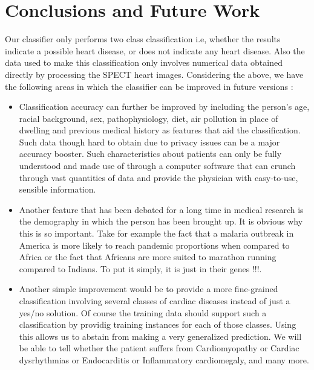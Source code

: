 \documentclass[11pt,a4paper]{report}
\begin{document}
{%



\chapter{Conclusions and Future Work}

Our classifier only performs two class classification i.e, whether the results indicate a possible heart disease, or does not indicate any heart disease. Also the data used to make this classification only involves numerical data obtained directly by processing the SPECT heart images. Considering the above, we have the following areas in which the classifier can be improved in future versions :\\

\begin{itemize}    
\item Classification accuracy can further be improved by including the person’s age, racial background, sex, pathophysiology, diet, air pollution in place of dwelling and previous medical history as features that aid the classification. Such data though hard to obtain due to privacy issues can be a major accuracy booster. Such characteristics about patients can only be fully understood and made use of through a computer software that can crunch through vast quantities of data and provide the physician with easy-to-use, sensible information. \\
\item Another feature that has been debated for a long time in medical research is the demography in which the person has been brought up. It is obvious why this is so important. Take for example the fact that a malaria outbreak in America is more likely to reach pandemic proportions when compared to Africa or the fact that Africans are more suited to marathon running compared to Indians. To put it simply, it is just in their genes !!!. \\
\item Another simple improvement would be to provide a more fine-grained classification involving several classes of cardiac diseases instead of just a yes/no solution. Of course the training data should support such a classification by providig training instances for each of those classes. Using this allows us to abstain from making a very generalized prediction. We will be able to tell whether the patient suffers from Cardiomyopathy or Cardiac dysrhythmias or Endocarditis or Inflammatory cardiomegaly, and many more.\\
\end{itemize}

}
\end{document}
